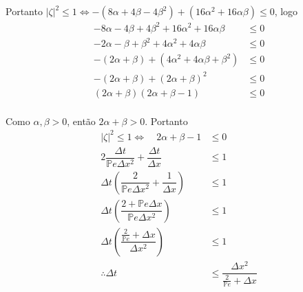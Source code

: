 \documentclass[12pt, a4paper]{article}
\newcommand{\bb}[1]{\mathbb{#1}}
\newcommand{\D}[1]{\Delta#1}
\begin{document}
    Portanto $|\zeta|^2 \leq 1 \iff - (8\alpha+4\beta-4\beta^2) + (16\alpha^2+16\alpha\beta) \leq 0$, logo
    \[\begin{split}
        -8\alpha-4\beta+4\beta^2 + 16\alpha^2+16\alpha\beta &\leq 0\\
        -2\alpha-\beta+\beta^2 + 4\alpha^2+4\alpha\beta &\leq 0\\
        -(2\alpha+\beta)+(4\alpha^2+4\alpha\beta+\beta^2) &\leq 0\\
        -(2\alpha+\beta)+{(2\alpha+\beta)}^2 &\leq 0\\
        (2\alpha+\beta)(2\alpha+\beta-1) &\leq 0\\
    \end{split}\]

    Como $\alpha,\beta > 0$, então $2\alpha+\beta > 0$. Portanto
    \[\begin{split}
        |\zeta|^2 \leq 1 \iff\quad 2\alpha+\beta-1 &\leq 0\\
        2\dfrac{\D{t}}{\bb{P}e\D{x^2}} + \dfrac{\D{t}}{\D{x}} &\leq 1\\
        \D{t}\left(\dfrac{2}{\bb{P}e\D{x^2}} + \dfrac{1}{\D{x}}\right) &\leq 1\\
        \D{t}\left(\dfrac{2+\bb{P}e\D{x}}{\bb{P}e\D{x^2}}\right) &\leq 1\\
        \D{t}\left(\dfrac{\frac{2}{\bb{P}e}+\D{x}}{\D{x^2}}\right) &\leq 1\\
        \therefore \D{t} &\leq \dfrac{\D{x^2}}{\frac{2}{\bb{P}e}+\D{x}}\\
    \end{split}\]
\end{document}
